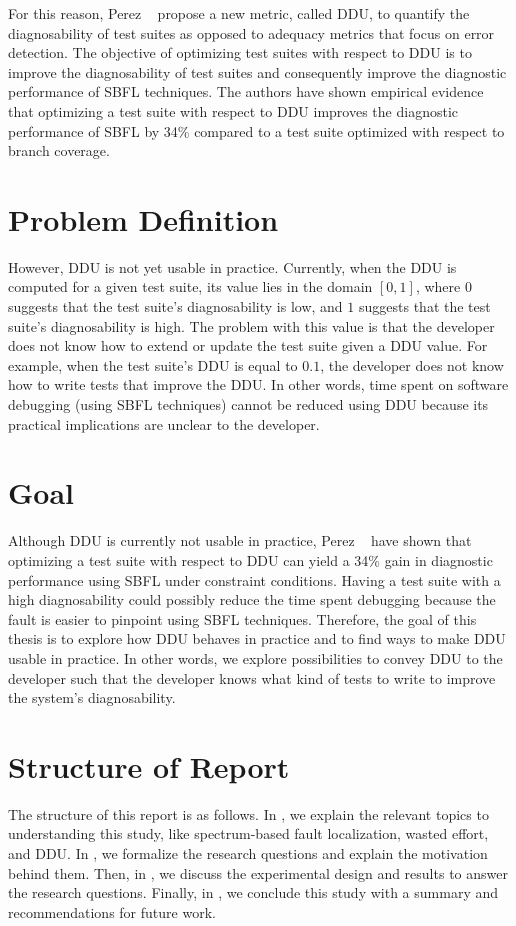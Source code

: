 \documentclass[twoside,a4paper,11pt]{memoir}
\begin{document}
For this reason, Perez \etal~\cite{DBLP:conf/icse/PerezAD17} propose a new metric, called DDU, to quantify the diagnosability of test suites as opposed to adequacy metrics that focus on error detection.
The objective of optimizing test suites with respect to DDU is to improve the diagnosability of test suites and consequently improve the diagnostic performance of SBFL techniques.
The authors have shown empirical evidence that optimizing a test suite with respect to DDU improves the diagnostic performance of SBFL by 34\% compared to a test suite optimized with respect to branch coverage.

\section{Problem Definition}%
\label{sec:problem_definition}
However, DDU is not yet usable in practice.
Currently, when the DDU is computed for a given test suite, its value lies in the domain \([ 0, 1 ]\), where \(0\) suggests that the test suite's diagnosability is low, and \(1\) suggests that the test suite's diagnosability is high.
The problem with this value is that the developer does not know how to extend or update the test suite given a DDU value.
For example, when the test suite's DDU is equal to \(0.1\), the developer does not know how to write tests that improve the DDU\@.
In other words, time spent on software debugging (using SBFL techniques) cannot be reduced using DDU because its practical implications are unclear to the developer.

\section{Goal}
Although DDU is currently not usable in practice, Perez \etal~\cite{DBLP:conf/icse/PerezAD17} have shown that optimizing a test suite with respect to DDU can yield a 34\% gain in diagnostic performance using SBFL under constraint conditions\@.
Having a test suite with a high diagnosability could possibly reduce the time spent debugging because the fault is easier to pinpoint using SBFL techniques.
Therefore, the goal of this thesis is to explore how DDU behaves in practice and to find ways to make DDU usable in practice.
In other words, we explore possibilities to convey DDU to the developer such that the developer knows what kind of tests to write to improve the system's diagnosability.

\section{Structure of Report}
The structure of this report is as follows.
In , we explain the relevant topics to understanding this study, like spectrum-based fault localization, wasted effort, and DDU\@.
In , we formalize the research questions and explain the motivation behind them.
Then, in , we discuss the experimental design and results to answer the research questions.
Finally, in , we conclude this study with a summary and recommendations for future work.
\end{document}
